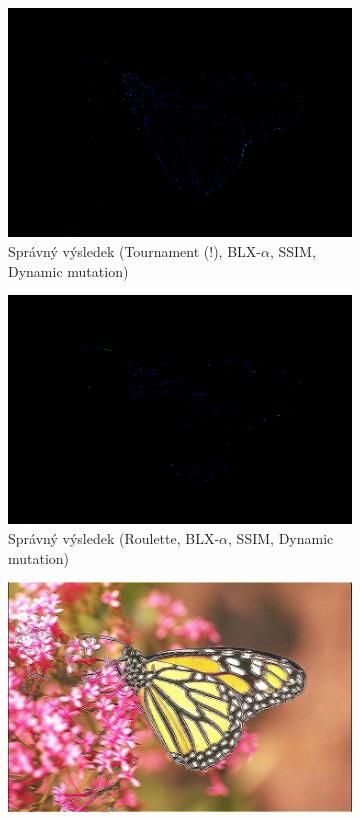 \documentclass[a4paper,11pt]{scrartcl}
\begin{document}
\begin{figure}[!h]
\begin{subfigure}[b]{0.32\textwidth}
        \includegraphics[width=\textwidth]{img/tournament-blx_a-ssim-dynamic_example3.jpg}
        \caption{Správný výsledek (Tournament (!), BLX-$\alpha$, SSIM, Dynamic mutation)}
        \label{fig:ex31}
    \end{subfigure}
    \begin{subfigure}[b]{0.32\textwidth}
        \includegraphics[width=\textwidth]{img/roulette-blx_a-ssim-dynamic_example3.jpg}
        \caption{Správný výsledek (Roulette, BLX-$\alpha$, SSIM, Dynamic mutation)}
        \label{fig:ex32}
    \end{subfigure}
    \begin{subfigure}[b]{0.32\textwidth}
        \includegraphics[width=\textwidth]{img/roulette-convex-mse-swap_example3.jpg}

\end{subfigure}
\end{figure}
\end{document}
